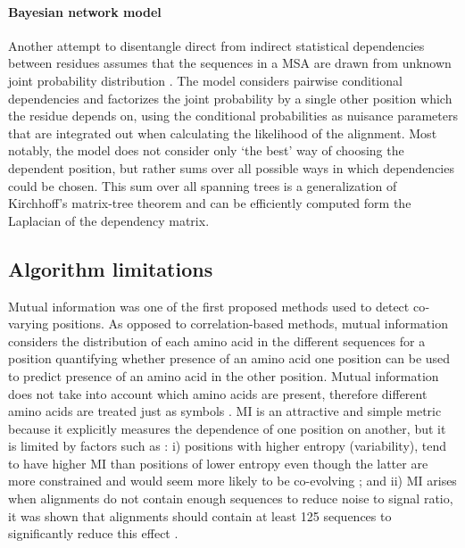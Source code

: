 \paragraph{Bayesian network model}
Another attempt to disentangle direct from indirect statistical dependencies between residues assumes that the sequences in a MSA are drawn from unknown joint probability distribution \cite{burger2010disentangling}. 
The model considers pairwise conditional dependencies and factorizes the joint probability by a single other position which the residue depends on, using the conditional probabilities as nuisance parameters that are integrated out when calculating the likelihood of the alignment. 
Most notably, the model does not consider only `the best' way of choosing the dependent position, but rather sums over all possible ways in which dependencies could be chosen.
This sum over all spanning trees is a generalization of Kirchhoff's matrix-tree theorem and can be efficiently computed form the Laplacian of the dependency matrix.

\subsection{Algorithm limitations}


Mutual information was one of the first proposed methods used to detect co‐varying positions. 
As opposed to correlation-based methods, mutual information considers the distribution of each amino acid in the different sequences for a position quantifying whether presence of an amino acid one position can be used to predict presence of an amino acid in the other position.
Mutual information does not take into account which amino acids are present, therefore different amino acids are treated just as symbols \cite{de2013emerging}.
MI is an attractive and simple metric because it explicitly measures the dependence of one position on another, but it is limited by factors such as \cite{dunn2008mutual}: 
i) positions with higher entropy (variability), tend to have higher MI than positions of lower entropy even though the latter are more constrained and would seem more likely to be co-evolving \cite{dunn2008mutual}; and 
ii) MI arises when alignments do not contain enough sequences to reduce noise to signal ratio, it was shown that alignments should contain at least 125 sequences to significantly reduce this effect \cite{martin2005using}.

